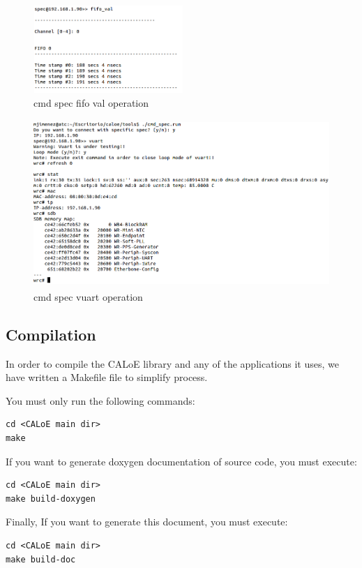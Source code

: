 \begin{figure}[H]
\centering
\includegraphics[width=215px,height=125px]{img/cmd_spec_dio_fifo.png}
\caption{cmd spec fifo val operation}
\label{cmd_spec_fifo_val_img}
\end{figure}

\begin{figure}[H]
\centering
\includegraphics[width=425px,height=240px]{img/cmd_spec_vuart.png}
\caption{cmd spec vuart operation}
\label{cmd_spec_vuart_img}
\end{figure}

\subsection{Compilation}

In order to compile the CALoE library and any of the applications it uses, we have written a Makefile file to simplify process.

You must only run the following commands:

\lstset{language=Bash}

\begin{lstlisting}[frame=single, label=make_caloe, caption=Compiling CALoE library\, devices and tools]
cd <CALoE main dir>
make
\end{lstlisting}

If you want to generate doxygen documentation of source code, you must execute:

\begin{lstlisting}[frame=single, label=make_doxygen, caption=Compiling CALoE library doxygen documentation]
cd <CALoE main dir>
make build-doxygen
\end{lstlisting}

Finally, If you want to generate this document, you must execute:

\begin{lstlisting}[frame=single, label=make_doc, caption=Compiling CALoE library documentation]
cd <CALoE main dir>
make build-doc
\end{lstlisting}
